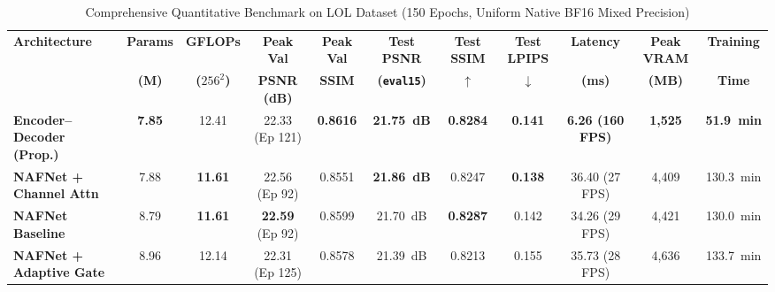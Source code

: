 \documentclass[journal,onecolumn,11pt]{IEEEtran}
\begin{document}
\begin{table}[htbp]
\caption{Comprehensive Quantitative Benchmark on LOL Dataset (150 Epochs, Uniform Native BF16 Mixed Precision)}
\label{tab:master_benchmark}
\centering
\begin{tabular}{@{}lcccccccccc@{}}
\toprule
\textbf{Architecture} & \textbf{Params} & \textbf{GFLOPs} & \textbf{Peak Val} & \textbf{Peak Val} & \textbf{Test PSNR} & \textbf{Test SSIM} & \textbf{Test LPIPS} & \textbf{Latency} & \textbf{Peak VRAM} & \textbf{Training} \\
& \textbf{(M)} & \textbf{($256^2$)} & \textbf{PSNR (dB)} & \textbf{SSIM} & \textbf{(\texttt{eval15})} & $\uparrow$ & $\downarrow$ & \textbf{(ms)} & \textbf{(MB)} & \textbf{Time} \\
\midrule
\textbf{Encoder--Decoder (Prop.)} & \textbf{7.85} & 12.41 & 22.33 (Ep 121) & \textbf{0.8616} & \textbf{21.75~dB} & \textbf{0.8284} & \textbf{0.141} & \textbf{6.26 (160 FPS)} & \textbf{1,525} & \textbf{51.9~min} \\
\textbf{NAFNet + Channel Attn} & 7.88 & \textbf{11.61} & 22.56 (Ep 92) & 0.8551 & \textbf{21.86~dB} & 0.8247 & \textbf{0.138} & 36.40 (27 FPS) & 4,409 & 130.3~min \\
\textbf{NAFNet Baseline} & 8.79 & \textbf{11.61} & \textbf{22.59} (Ep 92) & 0.8599 & 21.70~dB & \textbf{0.8287} & 0.142 & 34.26 (29 FPS) & 4,421 & 130.0~min \\
\textbf{NAFNet + Adaptive Gate} & 8.96 & 12.14 & 22.31 (Ep 125) & 0.8578 & 21.39~dB & 0.8213 & 0.155 & 35.73 (28 FPS) & 4,636 & 133.7~min \\
\bottomrule
\end{tabular}
\end{table}
\end{document}
